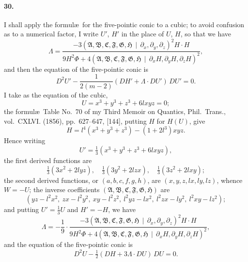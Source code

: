 \documentclass[12pt,a4paper]{article}
\theoremstyle{plain}
\begin{document}
\paragraph{30.}
I    shall   apply    the    formul\ae\  for   the    five-pointic    conic    to    a    cubic;    to    avoid
confusion  as  to  a  numerical  factor,  I  write  $U'$,  $H'$  in  the  place  of  $U$,  $H$,  so  that  we  have
\[
\Lambda = \frac{-3(\mathfrak{A}, \mathfrak{B}, \mathfrak{C}, \mathfrak{F}, \mathfrak{G}, \mathfrak{H} \,\!\!\mid\, \partial_x, \partial_y, \partial_z)^2 H \cdot H}{9H^2 \Phi + 4(\mathfrak{A}, \mathfrak{B}, \mathfrak{C}, \mathfrak{F}, \mathfrak{G}, \mathfrak{H} \,\!\!\mid\, \partial_x H, \partial_y H, \partial_z H)^2},
\]
and  then  the  equation  of  the  five-pointic  conic  is
\[
D^2 U' - \frac{1}{2(m-2)}(DH' + \Lambda \cdot DU') \, DU' = 0.
\]
I  take  as  the  equation  of  the  cubic,
\[
U = x^3 + y^3 + z^3 + 6lxyz = 0;
\]
the  formul\ae\  Table  No.~70   of  my  Third   Memoir  on    Quantics,  Phil.\ Trans.,   vol.~CXLVI.
(1856),  pp.~627--647,  [144],  putting  $H$  for  $H(U)$,  give
\[
H = l^4(x^3 + y^3 + z^3) - (1 + 2l^3) xyz.
\]
Hence  writing
\[
U' = \tfrac{1}{3}(x^3 + y^3 + z^3 + 6lxyz),
\]
the  first  derived  functions  are
\[
\tfrac{1}{3}(3x^2 + 2lyz), \quad \tfrac{1}{3}(3y^2 + 2lzx), \quad \tfrac{1}{3}(3z^2 + 2lxy);
\]
the  second  derived  functions,  or  $(a, b, c, f, g, h)$,  are  $(x, y, z, lx, ly, lz)$,  whence  $W = -U$;
the  inverse  coefficients  $(\mathfrak{A}, \mathfrak{B}, \mathfrak{C}, \mathfrak{F}, \mathfrak{G}, \mathfrak{H})$  are
\[
(yz - l^2x^2,\ zx - l^2y^2,\ xy - l^2z^2,\ l^2yz - lx^2,\ l^2zx - ly^2,\ l^2xy - lz^2);
\]
and  putting  $U' = \tfrac{1}{3}U$  and  $H' = -H$,  we  have
\[
\Lambda = -\frac{1}{9} \cdot \frac{-3(\mathfrak{A}, \mathfrak{B}, \mathfrak{C}, \mathfrak{F}, \mathfrak{G}, \mathfrak{H} \,\!\!\mid\, \partial_x, \partial_y, \partial_z)^2 H \cdot H}
               {9H^2 \Phi + 4(\mathfrak{A}, \mathfrak{B}, \mathfrak{C}, \mathfrak{F}, \mathfrak{G}, \mathfrak{H} \,\!\!\mid\, \partial_x H, \partial_y H, \partial_z H)^2},
\]
and  the  equation  of  the  five-pointic  conic  is
\[
D^2 U - \tfrac{1}{2}(DH + 3\Lambda \cdot DU) \, DU = 0.
\]
\end{document}
